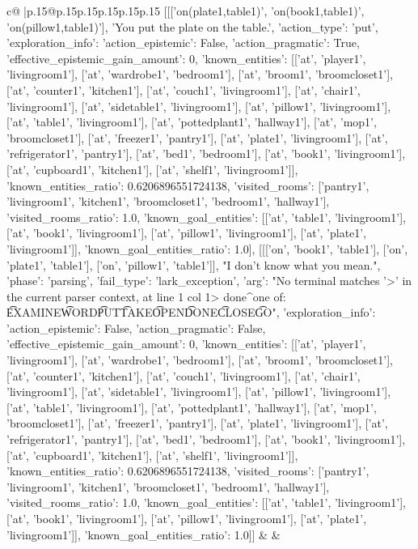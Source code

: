 \documentclass{article}
\begin{document}
{\begin{supertabular}{c@{$\;$}|p{.15\linewidth}@{}p{.15\linewidth}p{.15\linewidth}p{.15\linewidth}p{.15\linewidth}p{.15\linewidth}}
{{{	 [[['on(plate1,table1)', 'on(book1,table1)', 'on(pillow1,table1)'], 'You put the plate on the table.', {'action_type': 'put', 'exploration_info': {'action_epistemic': False, 'action_pragmatic': True, 'effective_epistemic_gain_amount': 0, 'known_entities': [['at', 'player1', 'livingroom1'], ['at', 'wardrobe1', 'bedroom1'], ['at', 'broom1', 'broomcloset1'], ['at', 'counter1', 'kitchen1'], ['at', 'couch1', 'livingroom1'], ['at', 'chair1', 'livingroom1'], ['at', 'sidetable1', 'livingroom1'], ['at', 'pillow1', 'livingroom1'], ['at', 'table1', 'livingroom1'], ['at', 'pottedplant1', 'hallway1'], ['at', 'mop1', 'broomcloset1'], ['at', 'freezer1', 'pantry1'], ['at', 'plate1', 'livingroom1'], ['at', 'refrigerator1', 'pantry1'], ['at', 'bed1', 'bedroom1'], ['at', 'book1', 'livingroom1'], ['at', 'cupboard1', 'kitchen1'], ['at', 'shelf1', 'livingroom1']], 'known_entities_ratio': 0.6206896551724138, 'visited_rooms': ['pantry1', 'livingroom1', 'kitchen1', 'broomcloset1', 'bedroom1', 'hallway1'], 'visited_rooms_ratio': 1.0, 'known_goal_entities': [['at', 'table1', 'livingroom1'], ['at', 'book1', 'livingroom1'], ['at', 'pillow1', 'livingroom1'], ['at', 'plate1', 'livingroom1']], 'known_goal_entities_ratio': 1.0}}], [[['on', 'book1', 'table1'], ['on', 'plate1', 'table1'], ['on', 'pillow1', 'table1']], "I don't know what you mean.", {'phase': 'parsing', 'fail_type': 'lark_exception', 'arg': "No terminal matches '>' in the current parser context, at line 1 col 1\n\n> done\n^\nExpected one of: \n\t* EXAMINE\n\t* WORD\n\t* PUT\n\t* TAKE\n\t* OPEN\n\t* DONE\n\t* CLOSE\n\t* GO\n", 'exploration_info': {'action_epistemic': False, 'action_pragmatic': False, 'effective_epistemic_gain_amount': 0, 'known_entities': [['at', 'player1', 'livingroom1'], ['at', 'wardrobe1', 'bedroom1'], ['at', 'broom1', 'broomcloset1'], ['at', 'counter1', 'kitchen1'], ['at', 'couch1', 'livingroom1'], ['at', 'chair1', 'livingroom1'], ['at', 'sidetable1', 'livingroom1'], ['at', 'pillow1', 'livingroom1'], ['at', 'table1', 'livingroom1'], ['at', 'pottedplant1', 'hallway1'], ['at', 'mop1', 'broomcloset1'], ['at', 'freezer1', 'pantry1'], ['at', 'plate1', 'livingroom1'], ['at', 'refrigerator1', 'pantry1'], ['at', 'bed1', 'bedroom1'], ['at', 'book1', 'livingroom1'], ['at', 'cupboard1', 'kitchen1'], ['at', 'shelf1', 'livingroom1']], 'known_entities_ratio': 0.6206896551724138, 'visited_rooms': ['pantry1', 'livingroom1', 'kitchen1', 'broomcloset1', 'bedroom1', 'hallway1'], 'visited_rooms_ratio': 1.0, 'known_goal_entities': [['at', 'table1', 'livingroom1'], ['at', 'book1', 'livingroom1'], ['at', 'pillow1', 'livingroom1'], ['at', 'plate1', 'livingroom1']], 'known_goal_entities_ratio': 1.0}}]] 
	  } 
	   } 
	   } 
	 & & \\ 
 


\end{supertabular}}
\end{document}
